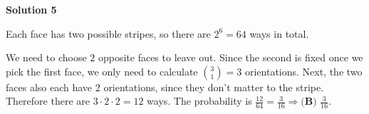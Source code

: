 \begin{enumerate}
 


 



\textbf{Solution 5}

Each face has two possible stripes, so there are $2^6=64$ ways in total.

 We need to choose $2$ opposite faces to leave out. Since the second is fixed once we pick the first face, we only need to calculate $\binom{3}{1}=3$ orientations. Next, the two faces also each have 2 orientations, since they don't matter to the stripe. Therefore there are $3\cdot2\cdot2=12$ ways. The probability is $\frac{12}{64}=\frac{3}{16} \Longrightarrow \boxed{\textbf{(B) } \frac{3}{16}}$.

 


\end{enumerate}